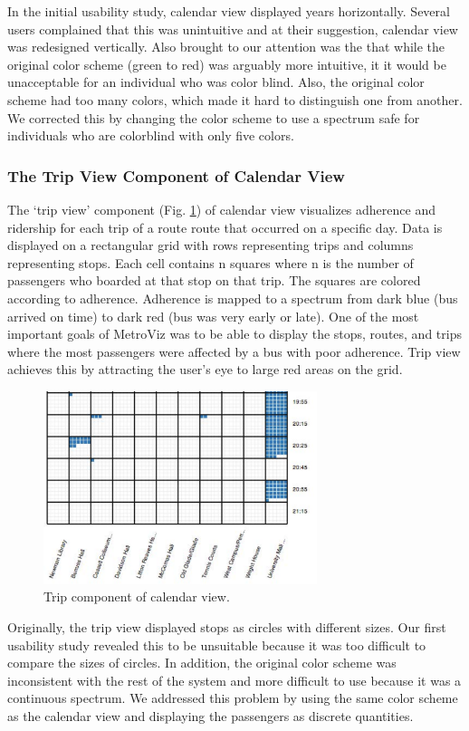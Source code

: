 \documentclass[journal]{vgtc}                %
\begin{document}
In the initial usability study, calendar view displayed years horizontally. Several users complained that this was unintuitive and at their suggestion, calendar view was redesigned vertically. Also brought to our attention was the that while the original color scheme (green to red) was arguably more intuitive, it it would be unacceptable for an individual who was color blind. Also, the original color scheme had too many colors, which made it hard to distinguish one from another. We corrected this by changing the color scheme to use a spectrum safe for individuals who are colorblind with only five colors.

\subsubsection{The Trip View Component of Calendar View}
The `trip view' component (Fig. \ref{trip_component}) of calendar view visualizes adherence and ridership for each trip of a route route that occurred on a specific day. Data is displayed on a rectangular grid with rows representing trips and columns representing stops. Each cell contains n squares where n is the number of passengers who boarded at that stop on that trip. The squares are colored according to adherence. Adherence is mapped to a spectrum from dark blue (bus arrived on time) to dark red (bus was very early or late). One of the most important goals of MetroViz was to be able to display the stops, routes, and trips where the most passengers were affected by a bus with poor adherence. Trip view achieves this by attracting the user's eye to large red areas on the grid.

\begin{figure}[htb]
 \centering
 \includegraphics[width=8cm]{img/image07}
 \caption{Trip component of calendar view.}
 \label{trip_component}
\end{figure}

Originally, the trip view displayed stops as circles with different sizes. Our first usability study revealed this to be unsuitable because it was too difficult to compare the sizes of circles. In addition, the original color scheme was inconsistent with the rest of the system and more difficult to use because it was a continuous spectrum. We addressed this problem by using the same color scheme as the calendar view and displaying the passengers as discrete quantities.
\end{document}
